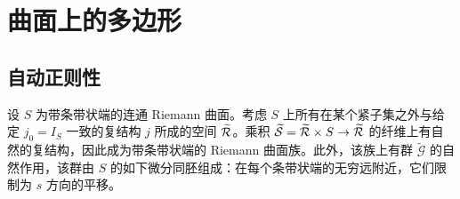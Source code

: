 \section{曲面上的多边形}\label{sec:13}\label{section:13}
\subsection{自动正则性}\label{sec:13a}
设 $S$ 为带条带状端的连通 Riemann 曲面。考虑 $S$ 上所有在某个紧子集之外与给定 $j_0=I_S$ 一致的复结构 $j$ 所成的空间 $\widetilde{\mathcal R}$。乘积 $\widetilde{\mathcal S}=\widetilde{\mathcal R}\times S\to\widetilde{\mathcal R}$ 的纤维上有自然的复结构，因此成为带条带状端的 Riemann 曲面族。此外，该族上有群 $\widetilde{\mathcal G}$ 的自然作用，该群由 $S$ 的如下微分同胚组成：在每个条带状端的无穷远附近，它们限制为 $s$ 方向的平移。

